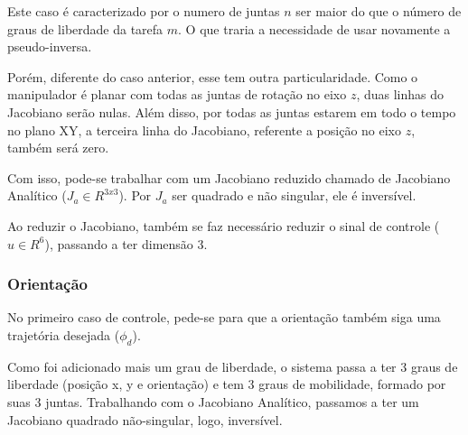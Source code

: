 \documentclass[a4paper,11pt]{article}
\theoremstyle{mytheor}
\begin{document}
Este caso é caracterizado por o numero de juntas $n$ ser maior do que o número de graus de liberdade da tarefa $m$. O que traria a necessidade de usar novamente a pseudo-inversa.

Porém, diferente do caso anterior, esse tem outra particularidade. Como o manipulador é planar com todas as juntas de rotação no eixo $z$, duas linhas do Jacobiano serão nulas. Além disso, por todas as juntas estarem em todo o tempo no plano XY, a terceira linha do Jacobiano, referente a posição no eixo $z$, também será zero.

Com isso, pode-se trabalhar com um Jacobiano reduzido chamado de Jacobiano Analítico ($J_a \in R^{3x3}$). Por $J_a$ ser quadrado e não singular, ele é inversível.

Ao reduzir o Jacobiano, também se faz necessário reduzir o sinal de controle ($u \in R^{6}$), passando a ter dimensão 3.


\subsubsection{Orientação}

No primeiro caso de controle, pede-se para que a orientação também siga uma trajetória desejada ($\phi_d$).

Como foi adicionado mais um grau de liberdade, o sistema passa a ter 3 graus de liberdade (posição x, y e orientação) e tem 3 graus de mobilidade, formado por suas 3 juntas. Trabalhando com o Jacobiano Analítico, passamos a ter um Jacobiano quadrado não-singular, logo, inversível.
\end{document}
